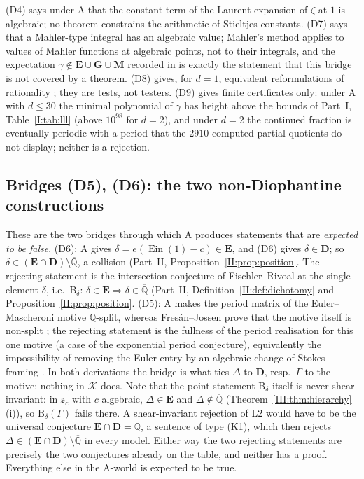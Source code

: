 \documentclass[11pt,a4paper]{article}
\newcommand{\Qbar}{\overline{\mathbb Q}}
\newcommand{\Ein}{\operatorname{Ein}}
\newcommand{\EE}{\mathbf E}
\newcommand{\GG}{\mathbf G}
\newcommand{\DD}{\mathbf D}
\newcommand{\Th}{\mathcal K}
\newcommand{\shear}{\mathfrak s}
\theoremstyle{definition}
\theoremstyle{remark}
\numberwithin{equation}{section}
\begin{document}
(D4) says under $\mathrm A$ that the constant term of the Laurent expansion of $\zeta$ at
$1$ is algebraic; no theorem constrains the arithmetic of Stieltjes constants. (D7) says
that a Mahler-type integral has an algebraic value; Mahler's method applies to values of
Mahler functions at algebraic points, not to their integrals, and the expectation
$\gamma\notin\EE\cup\GG\cup\mathbf M$ recorded in \cite{Rivoal2017} is exactly the
statement that this bridge is not covered by a theorem. (D8) gives, for $d=1$, equivalent
reformulations of rationality \cite{Sondow}; they are tests, not testers. (D9) gives
finite certificates only: under $\mathrm A$ with $d\le30$ the minimal polynomial of
$\gamma$ has height above the bounds of Part~I, Table~\ref{I:tab:lll} (above $10^{98}$ for $d=2$),
and under $d=2$ the continued fraction is eventually periodic with a period that the
$2910$ computed partial quotients do not display; neither is a rejection.

\subsection{Bridges (D5), (D6): the two non-Diophantine constructions}

These are the two bridges through which $\mathrm A$ produces statements that are
\emph{expected to be false}. (D6): $\mathrm A$ gives $\delta=e(\Ein(1)-c)\in\EE$, and
(D6) gives $\delta\in\DD$; so $\delta\in(\EE\cap\DD)\setminus\Qbar$, a collision (Part~II,
Proposition~\ref{II:prop:position}. The rejecting statement is the intersection conjecture of
Fischler--Rivoal \cite{FRmixed} at the single element $\delta$, i.e.\ $\mathrm B_\delta$:
$\delta\in\EE\Rightarrow\delta\in\Qbar$ (Part~II, Definition~\ref{II:def:dichotomy} and Proposition~\ref{II:prop:position}.
(D5): $\mathrm A$ makes
the period matrix of the Euler--Mascheroni motive $\Qbar$-split, whereas Fres\'an--Jossen
prove that the motive itself is non-split \cite{FJ}; the rejecting statement is the
fullness of the period realisation for this one motive (a case of the exponential period
conjecture), equivalently the impossibility of removing the Euler entry by an algebraic
change of Stokes framing \cite{K002}. In both derivations the bridge is what ties
$\Delta$ to $\DD$, resp.\ $\Gamma$ to the motive; nothing in $\Th$ does. Note that the
point statement $\mathrm B_\delta$ itself is never shear-invariant: in $\shear_c$ with $c$
algebraic, $\Delta\in\EE$ and $\Delta\notin\Qbar$ (Theorem~\ref{III:thm:hierarchy}(i)), so
$\mathrm B_\delta(\Gamma)$ fails there. A shear-invariant rejection of L2 would have to
be the universal conjecture $\EE\cap\DD=\Qbar$, a sentence of type (K1), which then
rejects $\Delta\in(\EE\cap\DD)\setminus\Qbar$ in every model. Either way the two
rejecting statements are precisely the two conjectures already on the table, and neither
has a proof. Everything else in the $\mathrm A$-world is expected to be true.
\end{document}

